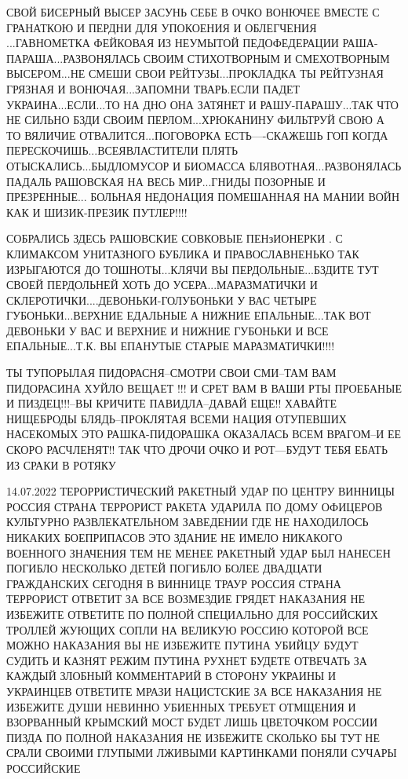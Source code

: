 СВОЙ БИСЕРНЫЙ ВЫСЕР ЗАСУНЬ СЕБЕ В ОЧКО ВОНЮЧЕЕ ВМЕСТЕ С ГРАНАТКОЮ И ПЕРДНИ ДЛЯ
УПОКОЕНИЯ И ОБЛЕГЧЕНИЯ ...ГАВНОМЕТКА ФЕЙКОВАЯ ИЗ НЕУМЫТОЙ ПЕДОФЕДЕРАЦИИ
РАША-ПАРАША...РАЗВОНЯЛАСЬ СВОИМ СТИХОТВОРНЫМ И СМЕХОТВОРНЫМ ВЫСЕРОМ...НЕ СМЕШИ
СВОИ РЕЙТУЗЫ...ПРОКЛАДКА ТЫ РЕЙТУЗНАЯ ГРЯЗНАЯ И ВОНЮЧАЯ...ЗАПОМНИ ТВАРЬ.ЕСЛИ
ПАДЕТ УКРАИНА...ЕСЛИ...ТО НА ДНО ОНА ЗАТЯНЕТ И РАШУ-ПАРАШУ...ТАК ЧТО НЕ СИЛЬНО
БЗДИ СВОИМ ПЕРЛОМ...ХРЮКАНИНУ ФИЛЬТРУЙ СВОЮ А ТО ВЯЛИЧИЕ ОТВАЛИТСЯ...ПОГОВОРКА
ЕСТЬ----СКАЖЕШЬ ГОП КОГДА ПЕРЕСКОЧИШЬ...ВСЕЯВЛАСТИТЕЛИ ПЛЯТЬ
ОТЫСКАЛИСЬ...БЫДЛОМУСОР И БИОМАССА БЛЯВОТНАЯ...РАЗВОНЯЛАСЬ ПАДАЛЬ РАШОВСКАЯ НА
ВЕСЬ МИР...ГНИДЫ ПОЗОРНЫЕ И ПРЕЗРЕННЫЕ... БОЛЬНАЯ НЕДОНАЦИЯ ПОМЕШАННАЯ НА МАНИИ
ВОЙН КАК И ШИЗИК-ПРЕЗИК ПУТЛЕР!!!!                              

СОБРАЛИСЬ ЗДЕСЬ РАШОВСКИЕ СОВКОВЫЕ ПЕНзИОНЕРКИ . С КЛИМАКСОМ УНИТАЗНОГО БУБЛИКА
И ПРАВОСЛАВНЕНЬКО ТАК ИЗРЫГАЮТСЯ ДО ТОШНОТЫ...КЛЯЧИ ВЫ ПЕРДОЛЬНЫЕ...БЗДИТЕ ТУТ
СВОЕЙ ПЕРДОЛЬНЕЙ ХОТЬ ДО УСЕРА...МАРАЗМАТИЧКИ И
СКЛЕРОТИЧКИ....ДЕВОНЬКИ-ГОЛУБОНЬКИ У ВАС ЧЕТЫРЕ ГУБОНЬКИ...ВЕРХНИЕ ЕДАЛЬНЫЕ А
НИЖНИЕ ЕПАЛЬНЫЕ...ТАК ВОТ ДЕВОНЬКИ У ВАС И ВЕРХНИЕ И НИЖНИЕ ГУБОНЬКИ И ВСЕ
ЕПАЛЬНЫЕ...Т.К. ВЫ ЕПАНУТЫЕ СТАРЫЕ МАРАЗМАТИЧКИ!!!!            

ТЫ ТУПОРЫЛАЯ ПИДОРАСНЯ--СМОТРИ СВОИ СМИ--ТАМ ВАМ ПИДОРАСИНА ХУЙЛО ВЕЩАЕТ !!! И
СРЕТ ВАМ В ВАШИ РТЫ ПРОЕБАНЫЕ И ПИЗДЕЦ!!!--ВЫ КРИЧИТЕ ПАВИДЛА--ДАВАЙ ЕЩЕ!!
ХАВАЙТЕ НИЩЕБРОДЫ БЛЯДЬ--ПРОКЛЯТАЯ ВСЕМИ НАЦИЯ ОТУПЕВШИХ НАСЕКОМЫХ ЭТО
РАШКА-ПИДОРАШКА ОКАЗАЛАСЬ ВСЕМ ВРАГОМ--И ЕЕ СКОРО РАСЧЛЕНЯТ!! ТАК ЧТО ДРОЧИ
ОЧКО И РОТ---БУДУТ ТЕБЯ ЕБАТЬ ИЗ СРАКИ В РОТЯКУ

14.07.2022
ТЕРОРРИСТИЧЕСКИЙ РАКЕТНЫЙ УДАР ПО ЦЕНТРУ ВИННИЦЫ РОССИЯ СТРАНА ТЕРРОРИСТ РАКЕТА
УДАРИЛА ПО ДОМУ ОФИЦЕРОВ КУЛЬТУРНО РАЗВЛЕКАТЕЛЬНОМ ЗАВЕДЕНИИ ГДЕ НЕ НАХОДИЛОСЬ
НИКАКИХ БОЕПРИПАСОВ ЭТО ЗДАНИЕ НЕ ИМЕЛО НИКАКОГО ВОЕННОГО ЗНАЧЕНИЯ ТЕМ НЕ МЕНЕЕ
РАКЕТНЫЙ УДАР БЫЛ НАНЕСЕН ПОГИБЛО НЕСКОЛЬКО ДЕТЕЙ ПОГИБЛО БОЛЕЕ ДВАДЦАТИ
ГРАЖДАНСКИХ СЕГОДНЯ В ВИННИЦЕ ТРАУР РОССИЯ СТРАНА ТЕРРОРИСТ ОТВЕТИТ ЗА ВСЕ
ВОЗМЕЗДИЕ ГРЯДЕТ НАКАЗАНИЯ НЕ ИЗБЕЖИТЕ ОТВЕТИТЕ ПО ПОЛНОЙ СПЕЦИАЛЬНО ДЛЯ
РОССИЙСКИХ ТРОЛЛЕЙ ЖУЮЩИХ СОПЛИ НА ВЕЛИКУЮ РОССИЮ КОТОРОЙ ВСЕ МОЖНО НАКАЗАНИЯ
ВЫ НЕ ИЗБЕЖИТЕ ПУТИНА УБИЙЦУ БУДУТ СУДИТЬ И КАЗНЯТ РЕЖИМ ПУТИНА РУХНЕТ БУДЕТЕ
ОТВЕЧАТЬ ЗА КАЖДЫЙ ЗЛОБНЫЙ КОММЕНТАРИЙ В СТОРОНУ УКРАИНЫ И УКРАИНЦЕВ ОТВЕТИТЕ
МРАЗИ НАЦИСТСКИЕ ЗА ВСЕ НАКАЗАНИЯ НЕ ИЗБЕЖИТЕ ДУШИ НЕВИННО УБИЕННЫХ ТРЕБУЕТ
ОТМЩЕНИЯ И ВЗОРВАННЫЙ КРЫМСКИЙ МОСТ БУДЕТ ЛИШЬ ЦВЕТОЧКОМ РОССИИ ПИЗДА ПО ПОЛНОЙ
НАКАЗАНИЯ НЕ ИЗБЕЖИТЕ СКОЛЬКО БЫ ТУТ НЕ СРАЛИ СВОИМИ ГЛУПЫМИ ЛЖИВЫМИ КАРТИНКАМИ
ПОНЯЛИ СУЧАРЫ РОССИЙСКИЕ

